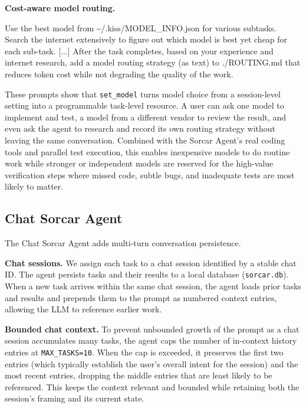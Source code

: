 \documentclass{article}
\newenvironment{promptbox}{%
  \begin{mdframed}[
    linewidth=0.4pt,
    linecolor=black,
    innerleftmargin=5pt,
    innerrightmargin=5pt,
    innertopmargin=5pt,
    innerbottommargin=5pt,
    skipabove=2pt,
    skipbelow=5pt]
  \setlength{\parskip}{0pt}\setlength{\parindent}{0pt}%
  \ttfamily\scriptsize\raggedright\frenchspacing\obeylines\leavevmode\strut\ignorespaces
}{%
  \end{mdframed}
}
\begin{document}
\noindent\textbf{Cost-aware model routing.}\par\vspace{1pt}
\begin{promptbox}%
Use the best model from \textasciitilde{}/.kiss/MODEL\_INFO.json for various
subtasks. Search the internet extensively to figure out which
model is best yet cheap for each sub-task. [...] After the task
completes, based on your experience and internet research, add a
model routing strategy (as text) to ./ROUTING.md that reduces
token cost while not degrading the quality of the work.%
\end{promptbox}

These prompts show that \texttt{set\_model} turns model choice from a session-level setting into a programmable task-level resource.  A user can ask one model to implement and test, a model from a different vendor to review the result, and even ask the agent to research and record its own routing strategy without leaving the same conversation.  Combined with the Sorcar Agent's real coding tools and parallel test execution, this enables inexpensive models to do routine work while stronger or independent models are reserved for the high-value verification steps where missed code, subtle bugs, and inadequate tests are most likely to matter.

\subsection{Chat Sorcar Agent}
\label{sec:chat-agent}

The Chat Sorcar Agent adds multi-turn conversation persistence.

\textbf{Chat sessions.}  We assign each task to a chat session identified by a stable chat ID.  The agent persists tasks and their results to a local database (\texttt{sorcar.db}).  When a new task arrives within the same chat session, the agent loads prior tasks and results and prepends them to the prompt as numbered context entries, allowing the LLM to reference earlier work.

\textbf{Bounded chat context.}  To prevent unbounded growth of the prompt as a chat session accumulates many tasks, the agent caps the number of in-context history entries at \texttt{MAX\_TASKS=10}.  When the cap is exceeded, it preserves the first two entries (which typically establish the user's overall intent for the session) and the most recent entries, dropping the middle entries that are least likely to be referenced.  This keeps the context relevant and bounded while retaining both the session's framing and its current state.
\end{document}
